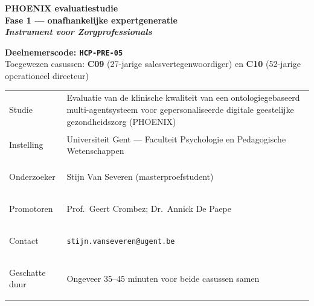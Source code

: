 \documentclass[11pt,a4paper]{article}
\renewcommand{\arraystretch}{1.28}
\begin{document}
\begin{titlepage}
\centering\vspace*{0.6cm}

\begin{tcolorbox}[
  colback=DarkBlue,colframe=DarkBlue,
  arc=3mm,left=14pt,right=14pt,top=12pt,bottom=12pt,
  width=\textwidth
]
\centering
{\fontsize{22}{28}\selectfont\bfseries\color{white}
PHOENIX evaluatiestudie\\[0.3em]
\fontsize{15}{20}\selectfont\color{AccentBlue}
Fase 1 --- onafhankelijke expertgeneratie\\[0.2em]
\fontsize{12}{16}\selectfont\color{white}
\textit{Instrument voor Zorgprofessionals}
}
\end{tcolorbox}

\vspace{0.7cm}

\begin{tcolorbox}[
  colback=AccentBlue,colframe=PrimaryBlue,
  arc=2.5mm,boxrule=1.2pt,left=12pt,right=12pt,top=10pt,bottom=10pt,
  width=0.86\textwidth
]
\centering
{\large\bfseries\color{DarkBlue}Deelnemerscode: \texttt{HCP-PRE-05}}\\[0.5em]
{\normalsize\color{SlateMid}
Toegewezen casussen:\quad
\textbf{\color{PrimaryBlue}C09} (27-jarige salesvertegenwoordiger)
\quad en \quad
\textbf{\color{PrimaryBlue}C10} (52-jarige operationeel directeur)
}
\end{tcolorbox}

\vspace{0.6cm}

\begin{tcolorbox}[
  colback=SoftBG,colframe=BorderGrey,
  arc=2mm,left=10pt,right=10pt,top=9pt,bottom=9pt,
  width=0.92\textwidth
]
\small\renewcommand{\arraystretch}{1.28}
\begin{tabularx}{\textwidth}{@{}>{\bfseries\raggedright\arraybackslash}p{}X@{}}
Studie & Evaluatie van de klinische kwaliteit van een ontologiegebaseerd multi-agentsysteem voor gepersonaliseerde digitale geestelijke gezondheidszorg (PHOENIX) \\
Instelling & Universiteit Gent --- Faculteit Psychologie en Pedagogische Wetenschappen \\
Onderzoeker & Stijn Van Severen (masterproefstudent) \\
Promotoren & Prof.\ Geert Crombez; Dr.\ Annick De Paepe \\
Contact & \texttt{stijn.vanseveren@ugent.be} \\
Geschatte duur & Ongeveer 35--45 minuten voor beide casussen samen \\
\end{tabularx}
\end{tcolorbox}


\end{titlepage}
\end{document}
